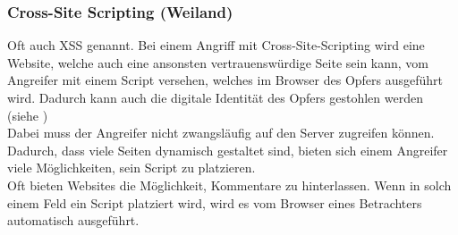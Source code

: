 \subsubsection{Cross-Site Scripting (Weiland)}
\label{sec:content_security_cross_site_scripting}
Oft auch XSS genannt. Bei einem Angriff mit Cross-Site-Scripting wird eine Website, welche auch eine ansonsten vertrauenswürdige Seite sein kann, vom Angreifer mit einem Script versehen, welches im Browser des Opfers ausgeführt wird. Dadurch kann auch die digitale Identität des Opfers gestohlen werden (siehe  )\\ %
Dabei muss der Angreifer nicht zwangsläufig auf den Server zugreifen können. Dadurch, dass viele Seiten dynamisch gestaltet sind, bieten sich einem Angreifer viele Möglichkeiten, sein Script zu platzieren. \\
Oft bieten Websites die Möglichkeit, Kommentare zu hinterlassen. Wenn in solch einem Feld ein Script platziert wird, wird es vom Browser eines Betrachters automatisch ausgeführt.
